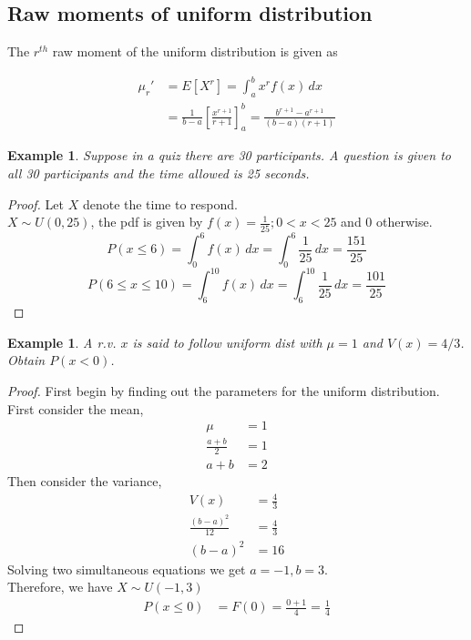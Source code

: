 \documentclass[oneside,11pt,pdftex]{book}%
\numberwithin{equation}{section}
\newtheorem{example}[theorem]{Example}
\numberwithin{section}{chapter}
\numberwithin{equation}{chapter}
\begin{document}
\subsection{Raw moments of uniform distribution}
The $ r^{th} $ raw moment of the uniform distribution is given as 

\begin{align*}
	\mu_r'&=E[X^r]=\int_a^b x^r f(x)\, dx \\
	&= \frac{1}{b-a}\left[ \frac{x^{r+1}}{r+1} \right]_a^b=\frac{b^{r+1}-a^{r+1}}{(b-a)(r+1)}
\end{align*}


\begin{example}
	Suppose in a quiz there are 30 participants. A question is given to all 30 participants and the time allowed is 25 seconds. 
\end{example}
\begin{proof}
	Let $ X$ denote the time to respond.\\
	$ X \sim U(0,25) $, the pdf is given by 
	$ f(x) =\frac{1}{25}; 0<x<25$ and $ 0 $ otherwise.
	$$ P(x\leq 6)=\int_0^6 f(x)\, dx=\int_0^6 \frac{1}{25}\, dx = \frac{151}{25}$$
	\[P(6 \leq x \leq 10)=\int_6^10 f(x)\, dx = \int_6^{10} \frac{1}{25}\, dx= \frac{101}{25} \]
\end{proof}

\begin{example}
	A r.v. $ x $ is said to follow uniform dist with $ \mu=1 $ and $ V(x) = 4/3$. Obtain $ P(x<0) $.
\end{example}
\begin{proof}
	First begin by finding out the parameters for the uniform distribution.\\
	First consider the mean,
	\begin{align*}
		\mu&=1\\
		\frac{a+b}{2}&=1\\
		a+b&=2
	\end{align*}
	Then consider the variance,
	\begin{align*}
		V(x)&=\frac{4}{3}\\
		\frac{(b-a)^2}{12}&=\frac{4}{3}\\
		(b-a)^2&=16
	\end{align*}
	Solving two simultaneous equations we get $ a=-1, b=3 $.\\
	Therefore, we have $ X \sim U(-1,3) $\\
	\begin{align*}
		P(x\leq0)&=F(0)=\frac{0+1}{4}=\frac{1}{4}
	\end{align*}
\end{proof}
\end{document}
